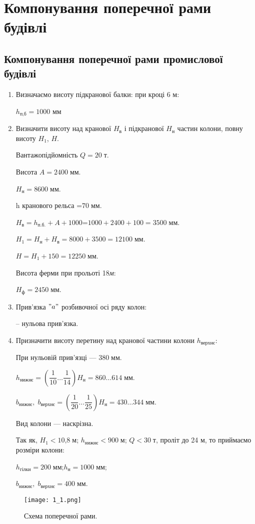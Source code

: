 \documentclass[a4paper,14pt]{article}
\author{}
\title{}
\date{\today}
\begin{document}
\section{Компонування поперечної рами будівлі}
\subsection{Компонування поперечної рами промислової будівлі}
\begin{enumerate}
\item Визначаємо висоту підкранової балки: при кроці 6 м:

$h_{\textit{п,б}}=1000$ мм

\item Визначити висоту над кранової $H_{\textit{в}}$ і підкранової $H_{\textit{н}}$ частин колони, повну висоту $H_{\textit{1}}$, $H$.

Вантажопідйомність $Q= 20\;{\textit{т}}$.

Висота $A=2400\;{\textit{мм}}$.

$H_{\textit{н}}=8600\;{\textit{мм}}$.

h кранового рельса =$70\;{\textit{мм}}$.

$H_{\textit{в}}=h_{\textit{п.б.}}+A+1000$=$1000+2400+100=3500\;\textit{мм}$.

$H_1=H_{\textit{н}}+H_{\textit{в}}=8000+3500=12100\;\textit{мм}$.

$H=H_1+150=12250\;\textit{мм}$.

Висота ферми при прольоті 18\;\textit{м}\;:

$H_{\textit{ф}}=2450\;\textit{мм}$.

\item Прив'язка $"a"$ розбивочної осі ряду колон:

-- нульова прив'язка.

\item Призначити висоту перетину над кранової частини колони $h_{\textit{верхнє}}$:

При нульовій прив'язці --- $380\;{\textit{мм}}$.

$h_{\textit{нижнє}}=\left(\dfrac{1}{10}\ldots\dfrac{1}{14}\right)H_\textit{н}=860\ldots614\;\textit{мм}$.

$b_{\textit{нижнє}},\;b_{\textit{верхнє}}=\left(\dfrac{1}{20}\ldots\dfrac{1}{25}\right)H_\textit{н}=430\ldots344\;\textit{мм}$.

Вид колони --- наскрізна.

Так як, $H_1<\textit{10,8}\;\textit{м}$; $h_\textit{нижнє}<\textit{900}\;\textit{м}$; $Q<\textit{30}\;\textit{т}$, проліт до 24 м, то приймаємо розміри колони:

$h_{\textit{гілки}}=200\;\textit{мм}$;\;$h_{\textit{н}}=1000\;\textit{мм}$;

$b_{\textit{нижнє}},\;b_{\textit{верхнє}}=400\;\textit{мм}$.
\end{enumerate}
\newpage
\begin{figure}[h]
    \texttt{[image: 1\_1.png]}
    \caption{Схема поперечної рами.}\label{ris1_1} 
\end{figure}
\newpage
\end{document}
